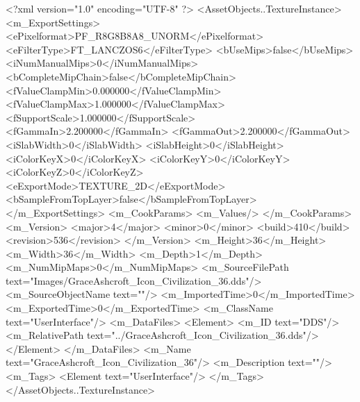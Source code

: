<?xml version="1.0" encoding="UTF-8" ?>
<AssetObjects..TextureInstance>
	<m_ExportSettings>
		<ePixelformat>PF_R8G8B8A8_UNORM</ePixelformat>
		<eFilterType>FT_LANCZOS6</eFilterType>
		<bUseMips>false</bUseMips>
		<iNumManualMips>0</iNumManualMips>
		<bCompleteMipChain>false</bCompleteMipChain>
		<fValueClampMin>0.000000</fValueClampMin>
		<fValueClampMax>1.000000</fValueClampMax>
		<fSupportScale>1.000000</fSupportScale>
		<fGammaIn>2.200000</fGammaIn>
		<fGammaOut>2.200000</fGammaOut>
		<iSlabWidth>0</iSlabWidth>
		<iSlabHeight>0</iSlabHeight>
		<iColorKeyX>0</iColorKeyX>
		<iColorKeyY>0</iColorKeyY>
		<iColorKeyZ>0</iColorKeyZ>
		<eExportMode>TEXTURE_2D</eExportMode>
		<bSampleFromTopLayer>false</bSampleFromTopLayer>
	</m_ExportSettings>
	<m_CookParams>
		<m_Values/>
	</m_CookParams>
	<m_Version>
		<major>4</major>
		<minor>0</minor>
		<build>410</build>
		<revision>536</revision>
	</m_Version>
	<m_Height>36</m_Height>
	<m_Width>36</m_Width>
	<m_Depth>1</m_Depth>
	<m_NumMipMaps>0</m_NumMipMaps>
	<m_SourceFilePath text="Images/GraceAshcroft_Icon_Civilization_36.dds"/>
	<m_SourceObjectName text=""/>
	<m_ImportedTime>0</m_ImportedTime>
	<m_ExportedTime>0</m_ExportedTime>
	<m_ClassName text="UserInterface"/>
	<m_DataFiles>
		<Element>
			<m_ID text="DDS"/>
			<m_RelativePath text="../GraceAshcroft_Icon_Civilization_36.dds"/>
		</Element>
	</m_DataFiles>
	<m_Name text="GraceAshcroft_Icon_Civilization_36"/>
	<m_Description text=""/>
	<m_Tags>
		<Element text="UserInterface"/>
	</m_Tags>
</AssetObjects..TextureInstance>
